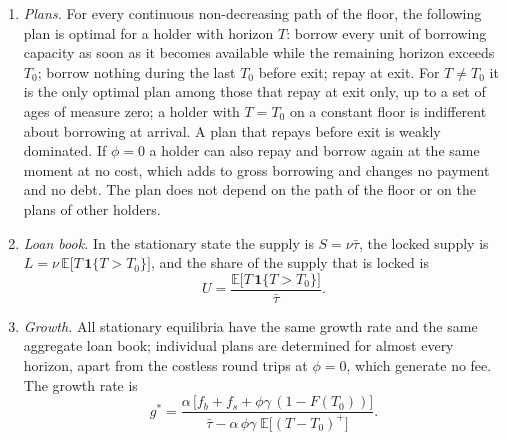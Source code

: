 \begin{theorem}\label{thm:eq}
\begin{enumerate}[label=(\alph*)]
\item \emph{Plans.} For every continuous non-decreasing path of the floor, the following plan is optimal for a holder with horizon $T$: borrow every unit of borrowing capacity as soon as it becomes available while the remaining horizon exceeds $T_0$; borrow nothing during the last $T_0$ before exit; repay at exit. For $T\ne T_0$ it is the only optimal plan among those that repay at exit only, up to a set of ages of measure zero; a holder with $T=T_0$ on a constant floor is indifferent about borrowing at arrival. A plan that repays before exit is weakly dominated. If $\phi=0$ a holder can also repay and borrow again at the same moment at no cost, which adds to gross borrowing and changes no payment and no debt. The plan does not depend on the path of the floor or on the plans of other holders.
\item \emph{Loan book.} In the stationary state the supply is $S=\nu\bar\tau$, the locked supply is $L=\nu\,\mathbb E\bigl[T\,\mathbf 1\{T>T_0\}\bigr]$, and the share of the supply that is locked is
\begin{equation}\label{eq:U}
U=\frac{\mathbb E\bigl[T\,\mathbf 1\{T>T_0\}\bigr]}{\bar\tau}.
\end{equation}
\item \emph{Growth.} All stationary equilibria have the same growth rate and the same aggregate loan book; individual plans are determined for almost every horizon, apart from the costless round trips at $\phi=0$, which generate no fee. The growth rate is
\begin{equation}\label{eq:g}
g^\ast=\frac{\alpha\,\bigl[f_b+f_s+\phi\gamma\,(1-F(T_0))\bigr]}{\bar\tau-\alpha\,\phi\gamma\;\mathbb E\bigl[(T-T_0)^+\bigr]} .
\end{equation}
\end{enumerate}
\end{theorem}
